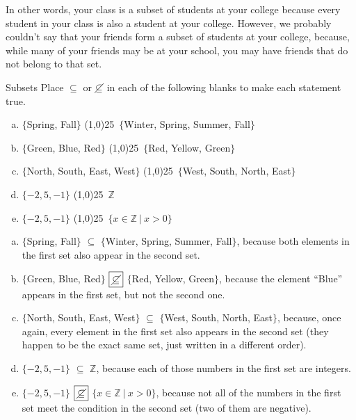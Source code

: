In other words, your class is a subset of students at your college because every student in your class is also a student at your college.  However, we probably couldn't say that your friends form a subset of students at your college, because, while many of your friends may be at your school, you may have friends that do not belong to that set.
\vfill
\text{}
\vfill
\pagebreak

\begin{example}{Subsets}
Place $\subseteq$ or $\cancel{\subseteq}$ in each of the following blanks to make each statement true.\\

\begin{enumerate}[(a)]
\item $\{$Spring, Fall$\}$ \line(1,0){25}\ $\{$Winter, Spring, Summer, Fall$\}$\\

\item $\{$Green, Blue, Red$\}$ \line(1,0){25}\ $\{$Red, Yellow, Green$\}$\\

\item $\{$North, South, East, West$\}$ \line(1,0){25}\ $\{$West, South, North, East$\}$\\

\item $\{-2,5,-1\}$ \line(1,0){25}\ $\mathbb{Z}$\\

\item $\{-2,5,-1\}$ \line(1,0){25}\ $\{x \in \mathbb{Z}\ |\ x > 0\}$
\end{enumerate}

\sol
\begin{enumerate}[(a)]
\item $\{$Spring, Fall$\}$ $\boxed{\subseteq}$ $\{$Winter, Spring, Summer, Fall$\}$, because both elements in the first set also appear in the second set.\\

\item $\{$Green, Blue, Red$\}$ $\boxed{\cancel{\subseteq}}$ $\{$Red, Yellow, Green$\}$, because the element ``Blue'' appears in the first set, but not the second one.\\

\item $\{$North, South, East, West$\}$ $\boxed{\subseteq}$ $\{$West, South, North, East$\}$, because, once again, every element in the first set also appears in the second set (they happen to be the exact same set, just written in a different order).\\

\item $\{-2,5,-1\}$ $\boxed{\subseteq}$ $\mathbb{Z}$, because each of those numbers in the first set are integers.\\

\item $\{-2,5,-1\}$ $\boxed{\cancel{\subseteq}}$ $\{x \in \mathbb{Z}\ |\ x > 0\}$, because not all of the numbers in the first set meet the condition in the second set (two of them are negative).
\end{enumerate}
\end{example}

